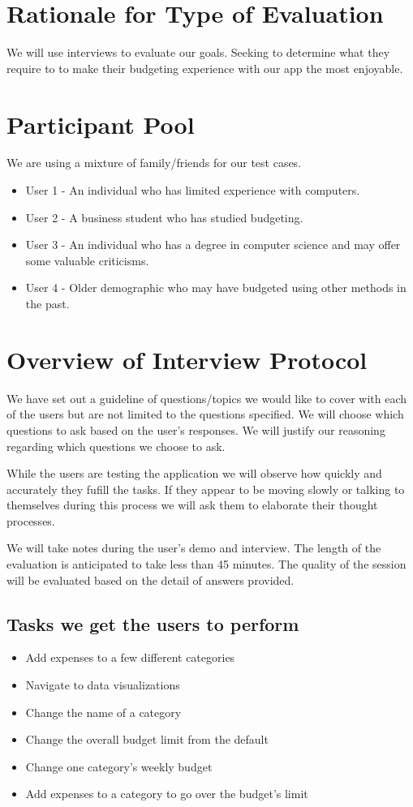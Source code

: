 \documentclass{chi2011}
\begin{document}
\section{Rationale for Type of Evaluation}

We will use interviews to evaluate our goals. Seeking to determine what they   
require to to make their budgeting experience with our app the most enjoyable. 

\section{Participant Pool}
We are using a mixture of family/friends for our test cases. 
\begin{itemize}
    \item User 1 - An individual who has limited experience with computers. 
	\item User 2 - A business student who has studied budgeting. 
	\item User 3 - An individual who has a degree in computer science and may offer some valuable criticisms. 
    \item User 4 - Older demographic who may have budgeted using other methods in the past.
\end{itemize}

\section{Overview of Interview Protocol}

We have set out a guideline of questions/topics we would like to cover with
each of the users but are not limited to the questions specified. We will
choose which questions to ask based on the user's responses. We will justify our
reasoning regarding which questions we choose to ask.

While the users are testing the application we will observe how quickly and
accurately they fufill the tasks. If they appear to be moving slowly or talking
to themselves during this process we will ask them to elaborate their thought
processes.

We will take notes during the user's demo and interview. The length of the
evaluation is anticipated to take less than 45 minutes. The quality of
the session will be evaluated based on the detail of answers provided.

	\subsection{Tasks we get the users to perform}
	\begin{itemize}
        \item  Add expenses to a few different categories
        \item  Navigate to data visualizations
        \item  Change the name of a category
        \item  Change the overall budget limit from the default
        \item  Change one category's weekly budget
        \item  Add expenses to a category to go over the budget's limit
	\end{itemize}
\end{document}
